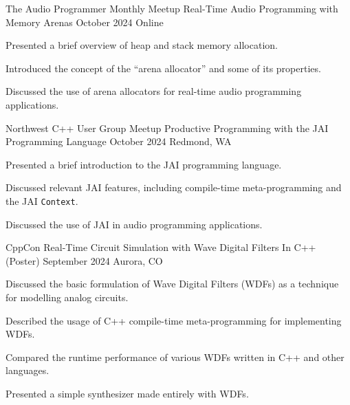 \begin{cventries}
  \cventry
    {The Audio Programmer Monthly Meetup} %
    {Real-Time Audio Programming with Memory Arenas} %
    {October 2024} %
    {Online} %
    {
      \begin{cvitems} %
        \item {Presented a brief overview of heap and stack memory allocation.}
        \item {Introduced the concept of the ``arena allocator'' and some of its properties.}
        \item {Discussed the use of arena allocators for real-time audio programming applications.}
      \end{cvitems}
    }

  \cventry
    {Northwest C++ User Group Meetup} %
    {Productive Programming with the JAI Programming Language} %
    {October 2024} %
    {Redmond, WA} %
    {
      \begin{cvitems} %
        \item {Presented a brief introduction to the JAI programming language.}
        \item {Discussed relevant JAI features, including compile-time meta-programming and the JAI \texttt{Context}.}
        \item {Discussed the use of JAI in audio programming applications.}
      \end{cvitems}
    }

  \cventry
    {CppCon} %
    {Real-Time Circuit Simulation with Wave Digital Filters In C++ (Poster)} %
    {September 2024} %
    {Aurora, CO} %
    {
      \begin{cvitems} %
        \item {Discussed the basic formulation of Wave Digital Filters (WDFs) as a technique for modelling analog circuits.}
        \item {Described the usage of C++ compile-time meta-programming for implementing WDFs.}
        \item {Compared the runtime performance of various WDFs written in C++ and other languages.}
        \item {Presented a simple synthesizer made entirely with WDFs.}
      \end{cvitems}
    }


\end{cventries}
